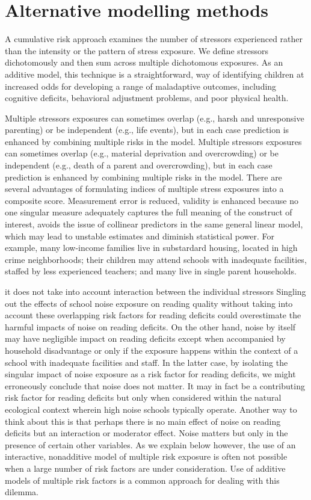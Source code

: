\documentclass[
  letterpaper,
  DIV=11,
  numbers=noendperiod]{scrreport}
\begin{document}
\section{Alternative modelling
methods}\label{alternative-modelling-methods}

A cumulative risk approach examines the number of stressors experienced
rather than the intensity or the pattern of stress exposure. We define
stressors dichotomously and then sum across multiple dichotomous
exposures. As an additive model, this technique is a straightforward,
way of identifying children at increased odds for developing a range of
maladaptive outcomes, including cognitive deficits, behavioral
adjustment problems, and poor physical health.

Multiple stressors exposures can sometimes overlap (e.g., harsh and
unresponsive parenting) or be independent (e.g., life events), but in
each case prediction is enhanced by combining multiple risks in the
model. Multiple stressors exposures can sometimes overlap (e.g.,
material deprivation and overcrowding) or be independent (e.g., death of
a parent and overcrowding), but in each case prediction is enhanced by
combining multiple risks in the model. There are several advantages of
formulating indices of multiple stress exposures into a composite score.
Measurement error is reduced, validity is enhanced because no one
singular measure adequately captures the full meaning of the construct
of interest, avoids the issue of collinear predictors in the same
general linear model, which may lead to unstable estimates and diminish
statistical power. For example, many low-income families live in
substardard housing, located in high crime neighborhoods; their children
may attend schools with inadequate facilities, staffed by less
experienced teachers; and many live in single parent households.

it does not take into account interaction between the individual
stressors Singling out the effects of school noise exposure on reading
quality without taking into account these overlapping risk factors for
reading deficits could overestimate the harmful impacts of noise on
reading deficits. On the other hand, noise by itself may have negligible
impact on reading deficits except when accompanied by household
disadvantage or only if the exposure happens within the context of a
school with inadequate facilities and staff. In the latter case, by
isolating the singular impact of noise exposure as a risk factor for
reading deficits, we might erroneously conclude that noise does not
matter. It may in fact be a contributing risk factor for reading
deficits but only when considered within the natural ecological context
wherein high noise schools typically operate. Another way to think about
this is that perhaps there is no main effect of noise on reading
deficits but an interaction or moderator effect. Noise matters but only
in the presence of certain other variables. As we explain below however,
the use of an interactive, nonadditive model of multiple risk exposure
is often not possible when a large number of risk factors are under
consideration. Use of additive models of multiple risk factors is a
common approach for dealing with this dilemma.
\end{document}
